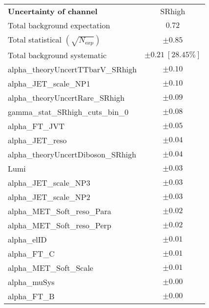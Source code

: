 
\begin{table}
\begin{center}
\setlength{\tabcolsep}{0.0pc}
\begin{tabular*}{\textwidth}{@{\extracolsep{\fill}}lc}
\noalign{\smallskip}\hline\noalign{\smallskip}
{\bfseries Uncertainty of channel}                                    & SRhigh            \\
\noalign{\smallskip}\hline\noalign{\smallskip}
Total background expectation             &  $0.72$       \\
\noalign{\smallskip}\hline\noalign{\smallskip}
Total statistical $(\sqrt{N_{\mathrm exp}})$              & $\pm 0.85$       \\
Total background systematic               & $\pm 0.21\ [28.45\%] $             \\
\noalign{\smallskip}\hline\noalign{\smallskip}
\noalign{\smallskip}\hline\noalign{\smallskip}
alpha\_theoryUncertTTbarV\_SRhigh         & $\pm 0.10$       \\
alpha\_JET\_scale\_NP1         & $\pm 0.10$       \\
alpha\_theoryUncertRare\_SRhigh         & $\pm 0.09$       \\
gamma\_stat\_SRhigh\_cuts\_bin\_0         & $\pm 0.08$       \\
alpha\_FT\_JVT         & $\pm 0.05$       \\
alpha\_JET\_reso         & $\pm 0.04$       \\
alpha\_theoryUncertDiboson\_SRhigh         & $\pm 0.04$       \\
Lumi         & $\pm 0.03$       \\
alpha\_JET\_scale\_NP3         & $\pm 0.03$       \\
alpha\_JET\_scale\_NP2         & $\pm 0.03$       \\
alpha\_MET\_Soft\_reso\_Para         & $\pm 0.02$       \\
alpha\_MET\_Soft\_reso\_Perp         & $\pm 0.02$       \\
alpha\_elID         & $\pm 0.01$       \\
alpha\_FT\_C         & $\pm 0.01$       \\
alpha\_MET\_Soft\_Scale         & $\pm 0.01$       \\
alpha\_muSys         & $\pm 0.00$       \\
alpha\_FT\_B         & $\pm 0.00$       \\

\end{tabular*}
\end{center}
\end{table}
